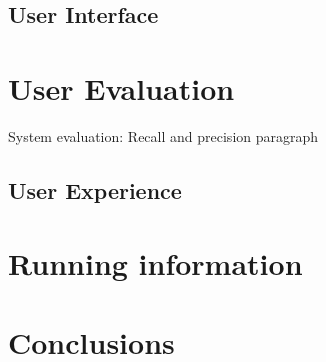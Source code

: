 \documentclass[12pt]{spieman}  %
\begin{document}
\begin{spacing}{1}
    \subsection{User Interface}\label{sec:ui}

    \section{User Evaluation}
    System evaluation: Recall and precision paragraph

    \subsection{User Experience}\label{sec:ux}

    \section{Running information}

    \section{Conclusions}

\end{spacing}
\end{document}
